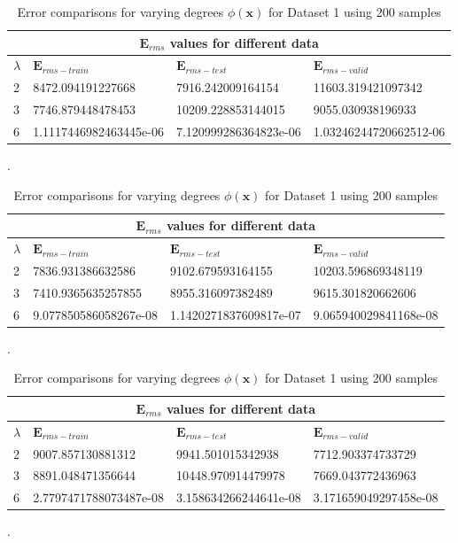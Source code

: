 {
\begin{table}[p]
\begin{tabular}{ |p{1.5cm}|p{3cm}|p{3cm}| p{3cm}|  }
\hline
\multicolumn{4}{|c|}{$\mathbf{E}_{rms}$ values for different data } \\
\hline
\rowcolor{lightgray} \textbf{$\lambda$} & $\mathbf{E}_{rms-train}$ & $\mathbf{E}_{rms-test}$ & $\mathbf{E}_{rms-valid}$ \\
\hline
 2   &   8472.094191227668  &  7916.242009164154  &  11603.319421097342   \\   
 \hline
 3   &   7746.879448478453   &   10209.228853144015  &   9055.030938196933     \\
 \hline
 6   &   1.1117446982463445e-06   &    7.120999286364823e-06     &     1.03246244720662512-06    \\
\hline
\end{tabular}
\caption{Error comparisons for varying degrees $\phi(\mathbf{x}) $ for Dataset 1 using 50 samples}.
\label{table:4}

 \vspace*{\floatsep}
 \begin{tabular}{ |p{1.5cm}|p{3cm}|p{3cm}| p{3cm}|  }
\hline
\multicolumn{4}{|c|}{$\mathbf{E}_{rms}$ values for different data } \\
\hline
\rowcolor{lightgray} \textbf{$\lambda$} & $\mathbf{E}_{rms-train}$ & $\mathbf{E}_{rms-test}$ & $\mathbf{E}_{rms-valid}$ \\
\hline
 2   &   7836.931386632586  &  9102.679593164155 &  10203.596869348119   \\   
 \hline
 3   &   7410.9365635257855   &   8955.316097382489  &   9615.301820662606     \\
 \hline
 6   &   9.077850586058267e-08   &    1.1420271837609817e-07     &     9.065940029841168e-08    \\
\hline
\end{tabular}
\caption{Error comparisons for varying degrees $\phi(\mathbf{x}) $ for Dataset 1 using 100 samples}.
\label{table:5}

\vspace*{\floatsep}
 \begin{tabular}{ |p{1.5cm}|p{3cm}|p{3cm}| p{3cm}|  }
\hline
\multicolumn{4}{|c|}{$\mathbf{E}_{rms}$ values for different data } \\
\hline
\rowcolor{lightgray} \textbf{$\lambda$} & $\mathbf{E}_{rms-train}$ & $\mathbf{E}_{rms-test}$ & $\mathbf{E}_{rms-valid}$ \\
\hline
 2   &   9007.857130881312  &  9941.501015342938 & 7712.903374733729   \\   
 \hline
 3   &   8891.048471356644   &   10448.970914479978  &   7669.043772436963    \\
 \hline
 6   &   2.7797471788073487e-08   &    3.158634266244641e-08     &     3.171659049297458e-08   \\
\hline
\end{tabular}
\caption{Error comparisons for varying degrees $\phi(\mathbf{x}) $ for Dataset 1 using 200 samples}.
\label{table:6}


\end{table}}
